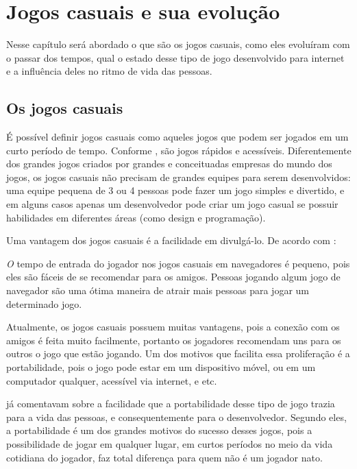 \section{Jogos casuais e sua evolução}

Nesse capítulo será abordado o que são os jogos casuais, como eles
evoluíram com o passar dos tempos, qual o estado desse tipo de jogo
desenvolvido para internet e a influência deles no ritmo de vida das
pessoas.

\subsection{Os jogos casuais}

É possível definir jogos casuais como aqueles jogos que podem ser
jogados em um curto período
de tempo. Conforme , são jogos rápidos e acessíveis.
Diferentemente dos grandes jogos criados por grandes e conceituadas
empresas do mundo dos jogos, os jogos casuais não precisam de grandes
equipes para serem desenvolvidos: uma equipe pequena de 3 ou 4 pessoas
pode fazer um jogo simples e divertido, e em alguns casos apenas um
desenvolvedor pode criar um jogo casual se possuir habilidades em
diferentes áreas (como design e programação).

Uma vantagem dos jogos casuais é a facilidade em divulgá-lo. De acordo com
:

\begin{singlespacing}
\begin{citacao}{4cm}{0cm}\footnotesize \emph
    O tempo de entrada do jogador nos jogos casuais em navegadores é pequeno,
    pois eles são fáceis de se recomendar para os amigos. Pessoas jogando
    algum jogo de navegador são uma ótima maneira de atrair mais
    pessoas para jogar um determinado jogo.
\end{citacao}
\end{singlespacing}

Atualmente, os jogos casuais possuem muitas vantagens, pois a conexão
com os amigos é feita muito facilmente, portanto os jogadores
recomendam uns para os outros o jogo que estão jogando. Um dos motivos
que facilita essa proliferação é a portabilidade, pois o jogo pode
estar em um dispositivo móvel, ou em um computador qualquer, acessível
via internet, e etc.

 já comentavam sobre a facilidade que a
portabilidade desse tipo de jogo trazia para a vida das pessoas, e
consequentemente para o desenvolvedor. Segundo eles, a portabilidade é um
dos grandes motivos do sucesso desses jogos, pois a possibilidade de
jogar em qualquer lugar, em curtos períodos no meio da vida cotidiana
do jogador, faz total diferença para quem não é um jogador nato.


